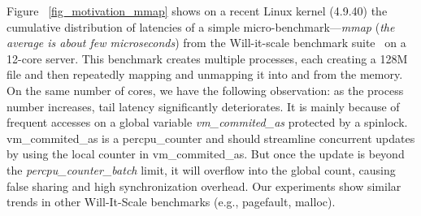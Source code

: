 \documentclass[pageno]{jpaper}
\begin{document}
Figure ~\ref{fig_motivation_mmap} shows on a recent Linux kernel (4.9.40) the cumulative distribution of latencies of a simple micro-benchmark---\emph{mmap} (\emph{the average is about  few microseconds}) from the Will-it-scale benchmark suite~\cite{Will-It-Scale} on a 12-core server. This benchmark creates multiple processes, each creating a 128M file and then repeatedly mapping and unmapping it into and from the memory. On the same number of cores, we have the following observation: as the process number  increases, tail latency  significantly deteriorates.
It is mainly because of frequent accesses on a global variable \emph{vm\_commited\_as} protected by a spinlock.  vm\_commited\_as is a percpu\_counter and should streamline  concurrent updates by using the local counter in vm\_commited\_as. But once the update is beyond the \emph{percpu\_counter\_batch} limit, it will overflow into the global count, causing false sharing and high synchronization overhead.
Our experiments show similar trends in other Will-It-Scale benchmarks (e.g., pagefault, malloc). 
\end{document}
